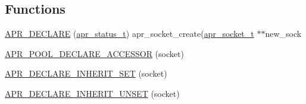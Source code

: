 \subsection*{Functions}
\begin{DoxyCompactItemize}
\item 
\mbox{\hyperlink{group__apr__network__io_gaebf0d76ea5cbea96a7d6929dc7169750}{A\+P\+R\+\_\+\+D\+E\+C\+L\+A\+RE}} (\mbox{\hyperlink{group__apr__errno_gaf76ee4543247e9fb3f3546203e590a6c}{apr\+\_\+status\+\_\+t}}) apr\+\_\+socket\+\_\+create(\mbox{\hyperlink{structapr__socket__t}{apr\+\_\+socket\+\_\+t}} $\ast$$\ast$new\+\_\+sock
\item 
\mbox{\hyperlink{group__apr__network__io_gab6f56c2b55bde77d91ce4d7f0a9b7454}{A\+P\+R\+\_\+\+P\+O\+O\+L\+\_\+\+D\+E\+C\+L\+A\+R\+E\+\_\+\+A\+C\+C\+E\+S\+S\+OR}} (socket)
\item 
\mbox{\hyperlink{group__apr__network__io_gaf60d2e3feb2dec7ea0bfbd3ba95a9dea}{A\+P\+R\+\_\+\+D\+E\+C\+L\+A\+R\+E\+\_\+\+I\+N\+H\+E\+R\+I\+T\+\_\+\+S\+ET}} (socket)
\item 
\mbox{\hyperlink{group__apr__network__io_ga0dec0319399cb788c51de7159dd338c0}{A\+P\+R\+\_\+\+D\+E\+C\+L\+A\+R\+E\+\_\+\+I\+N\+H\+E\+R\+I\+T\+\_\+\+U\+N\+S\+ET}} (socket)
\end{DoxyCompactItemize}
